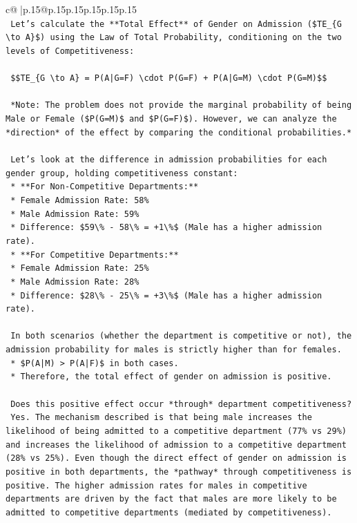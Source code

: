 \documentclass{article}
\begin{document}
{\begin{supertabular}{c@{$\;$}|p{.15\linewidth}@{}p{.15\linewidth}p{.15\linewidth}p{.15\linewidth}p{.15\linewidth}p{.15\linewidth}}
{{{\\ 
\texttt{    Let's calculate the **Total Effect** of Gender on Admission (\$TE\_\{G \textbackslash{}to A\}\$) using the Law of Total Probability, conditioning on the two levels of Competitiveness:} \\
\\ 
\texttt{    \$\$TE\_\{G \textbackslash{}to A\} = P(A|G=F) \textbackslash{}cdot P(G=F) + P(A|G=M) \textbackslash{}cdot P(G=M)\$\$} \\
\\ 
\texttt{    *Note: The problem does not provide the marginal probability of being Male or Female (\$P(G=M)\$ and \$P(G=F)\$). However, we can analyze the *direction* of the effect by comparing the conditional probabilities.*} \\
\\ 
\texttt{    Let's look at the difference in admission probabilities for each gender group, holding competitiveness constant:} \\
\texttt{    *   **For Non{-}Competitive Departments:**} \\
\texttt{        *   Female Admission Rate: 58\%} \\
\texttt{        *   Male Admission Rate: 59\%} \\
\texttt{        *   Difference: \$59\textbackslash{}\% {-} 58\textbackslash{}\% = +1\textbackslash{}\%\$ (Male has a higher admission rate).} \\
\texttt{    *   **For Competitive Departments:**} \\
\texttt{        *   Female Admission Rate: 25\%} \\
\texttt{        *   Male Admission Rate: 28\%} \\
\texttt{        *   Difference: \$28\textbackslash{}\% {-} 25\textbackslash{}\% = +3\textbackslash{}\%\$ (Male has a higher admission rate).} \\
\\ 
\texttt{    In both scenarios (whether the department is competitive or not), the admission probability for males is strictly higher than for females.} \\
\texttt{    *   \$P(A|M) > P(A|F)\$ in both cases.} \\
\texttt{    *   Therefore, the total effect of gender on admission is positive.} \\
\\ 
\texttt{    Does this positive effect occur *through* department competitiveness?} \\
\texttt{    Yes. The mechanism described is that being male increases the likelihood of being admitted to a competitive department (77\% vs 29\%) and increases the likelihood of admission to a competitive department (28\% vs 25\%). Even though the direct effect of gender on admission is positive in both departments, the *pathway* through competitiveness is positive. The higher admission rates for males in competitive departments are driven by the fact that males are more likely to be admitted to competitive departments (mediated by competitiveness).} \\
}}}
\end{supertabular}}
\end{document}
